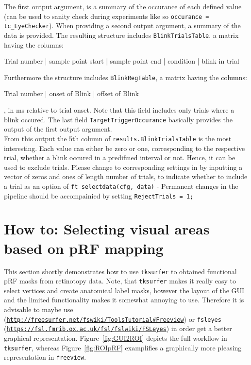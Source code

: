 \documentclass[12pt,a4paper]{scrartcl}
\begin{document}
The first output argument, is a summary of the occurance of each defined value (can be used to sanity check during experiments like so \texttt{occurance = tc\_EyeChecker}). When providing a second output argument, a summary of the data is provided. The resulting structure includes \texttt{BlinkTrialsTable}, a matrix having the columns:\\
\begin{center}
  Trial number | sample point start | sample point end | condition | blink in trial
\end{center}
Furthermore the structure includes \texttt{BlinkRegTable}, a matrix having the columns:\\
\begin{center}
  Trial number | onset of Blink | offset of Blink
\end{center}
, in ms relative to trial onset. Note that this field includes only trials where a blink occured. The last field \texttt{TargetTriggerOccurance} basically provides the output of the first output argument.\\

\noindent From this output the 5th column of \texttt{results.BlinkTrialsTable} is the most interesting. Each value can either be zero or one, corresponding to the respective trial, whether a blink occured in a predifined interval or not. Hence, it can be used to exclude trials. Please change to corresponding settings in  by inputting a vector of zeros and ones of length number of trials, to indicate whether to include a trial as an option of \texttt{ft\_selectdata(cfg, data)} - Permanent changes in the pipeline should be accompainied by setting \texttt{RejectTrials = 1;}

\section{How to: Selecting visual areas based on pRF mapping}
\label{sec:GUIprf}
This section shortly demonstrates how to use \texttt{tksurfer} to obtained functional pRF masks from retinotopy data. Note, that \texttt{tksurfer} makes it
really easy to select vertices and create anatomical label masks, however the
layout of the GUI and the limited functionality makes it somewhat annoying to use. Therefore it is advisable to maybe use  (\href{http://freesurfer.net/fswiki/ToolsTutorial#Freeview}{\nolinkurl{http://freesurfer.net/fswiki/ToolsTutorial#Freeview}}) or \texttt{fsleyes} (\href{https://fsl.fmrib.ox.ac.uk/fsl/fslwiki/FSLeyes}{\nolinkurl{https://fsl.fmrib.ox.ac.uk/fsl/fslwiki/FSLeyes}}) in order get a better graphical representation. Figure~\ref{fig:GUI2ROI} depicts the full workflow in \texttt{tksurfer}, whereas Figure~\ref{fig:ROIpRF} examplifies a graphically more pleasing representation in \texttt{freeview}.\\
\end{document}
